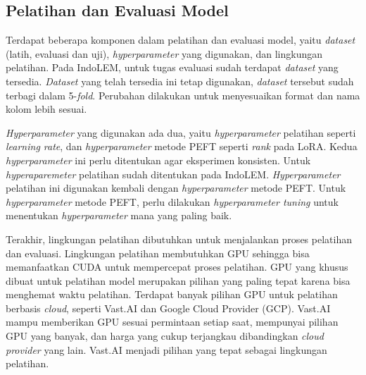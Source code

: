 \subsection{Pelatihan dan Evaluasi Model}

Terdapat beberapa komponen dalam pelatihan dan evaluasi model, yaitu \textit{dataset} (latih, evaluasi dan uji), \textit{hyperparameter} yang digunakan, dan lingkungan pelatihan. Pada IndoLEM, untuk tugas evaluasi \nlptask sudah terdapat \textit{dataset} yang tersedia. \textit{Dataset} yang telah tersedia ini tetap digunakan, \textit{dataset} tersebut sudah terbagi dalam 5-\textit{fold}. Perubahan dilakukan untuk menyesuaikan format dan nama kolom  lebih sesuai.

\textit{Hyperparameter} yang digunakan ada dua, yaitu \textit{hyperparameter} pelatihan seperti \textit{learning rate}, dan \textit{hyperparameter} metode PEFT seperti \textit{rank} pada LoRA. Kedua \textit{hyperparameter} ini perlu ditentukan agar eksperimen konsisten. Untuk \textit{hyperaparemeter} pelatihan sudah ditentukan pada IndoLEM. \textit{Hyperparameter} pelatihan ini digunakan kembali dengan \textit{hyperparameter} metode PEFT. Untuk \textit{hyperparameter} metode PEFT, perlu dilakukan \textit{hyperparameter tuning} untuk menentukan \textit{hyperparameter} mana yang paling baik.

Terakhir, lingkungan pelatihan dibutuhkan untuk menjalankan proses pelatihan dan evaluasi. Lingkungan pelatihan membutuhkan GPU sehingga bisa memanfaatkan CUDA untuk mempercepat proses pelatihan. GPU yang khusus dibuat untuk pelatihan model merupakan pilihan yang paling tepat karena bisa menghemat waktu pelatihan. Terdapat banyak pilihan GPU untuk pelatihan berbasis \textit{cloud}, seperti Vast.AI dan Google Cloud Provider (GCP). Vast.AI mampu memberikan GPU sesuai permintaan setiap saat, mempunyai pilihan GPU yang banyak, dan harga yang cukup terjangkau dibandingkan \textit{cloud provider} yang lain. Vast.AI menjadi pilihan yang tepat sebagai lingkungan pelatihan.

